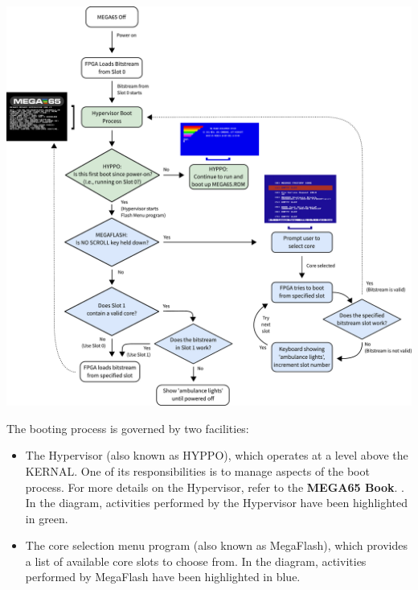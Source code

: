 \includegraphics[width=\linewidth]{images/illustrations/flashmenu-flowchart.pdf}

The booting process is governed by two facilities:
\begin{itemize}
  \item The Hypervisor (also known as HYPPO), which operates at a level above the KERNAL. One of its responsibilities is to manage aspects of the boot process. For more details on the Hypervisor, refer to
\ifdefined\printmanual
the {\bf MEGA65 Book}.
\else
 .
\fi
    In the diagram, activities performed by the Hypervisor have been highlighted in green.
  \item The core selection menu program (also known as MegaFlash), which provides a list of available core slots to choose from. In the diagram, activities performed by MegaFlash have been highlighted in blue.
\end{itemize}

